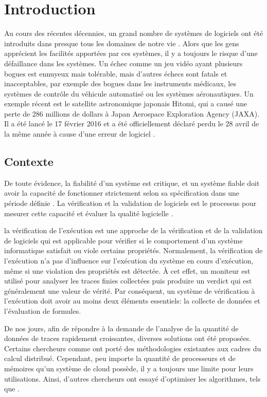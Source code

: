 
\chapter{Introduction}

Au cours des récentes décennies, un grand nombre de systèmes de logiciels ont été introduits dans presque tous les domaines de notre vie \citep{clarke1999model}. Alors que les gens apprécient les facilités apportées par ces systèmes, il y a toujours le risque d'une défaillance dans les systèmes. Un échec comme un jeu vidéo ayant plusieurs bogues est ennuyeux mais tolérable, mais d'autres échecs sont fatals et inacceptables, par exemple des bogues dans les instruments médicaux, les systèmes de contrôle du véhicule automatisé ou les systèmes aéronautiques. Un exemple récent est le satellite astronomique japonais Hitomi, qui a causé une perte de 286 millions de dollars à Japan Aerospace Exploration Agency (JAXA). Il a été lancé le 17 février 2016 et a été officiellement déclaré perdu le 28 avril de la même année à cause d'une erreur de logiciel \citep{nature2016}.

\section{Contexte}

De toute évidence, la fiabilité d'un système est critique, et un système fiable doit avoir la capacité de fonctionner strictement selon sa spécification dans une période définie \citep{avivzienis2004basic}. La vérification et la validation de logiciels est le processus pour mesurer cette capacité et évaluer la qualité logicielle \citep{ieeestd2012}.

la vérification de l'exécution \citep{leucker2009brief} est une approche de la vérification et de la validation de logiciels qui est applicable pour vérifier si le comportement d'un système informatique satisfait ou viole certains propriétés. Normalement, la vérification de l'exécution n'a pas d'influence sur l'exécution du système en cours d'exécution, même si une violation des propriétés est détectée. À cet effet, un moniteur est utilisé pour analyser les traces finies collectées puis produire un verdict qui est généralement une valeur de vérité. Par conséquent, un système de vérification à l'exécution doit avoir au moins deux éléments essentiels: la collecte de données et l'évaluation de formules.

De nos jours, afin de répondre à la demande de l'analyse de la quantité de données de traces rapidement croissantes, diverses solutions ont été proposées. Certains chercheurs comme \cite{barre2012mapreduce} ont porté des méthodologies existantes aux cadres du calcul distribué. Cependant, peu importe la quantité de processeurs et de mémoires qu'un système de cloud possède, il y a toujours une limite pour leurs utilisations. Ainsi, d'autres chercheurs ont essayé d'optimiser les algorithmes, tels que \cite{havelund2001monitoring}.

